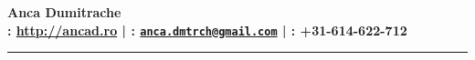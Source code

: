\documentclass[10pt]{article}
\renewcommand\emph[1]{#1}
\newcommand{\makeheading}[2][]%
        {\hspace*{-\marginparsep minus \marginparwidth}%
         \begin{minipage}[t]{\textwidth+\marginparwidth+\marginparsep}%
             {\large \bfseries #2 \hfill #1}\\[-0.15\baselineskip]%
                 \rule{\columnwidth}{1pt}%
         \end{minipage}}
\renewcommand{\section}[1]{\pagebreak[3]%
    \vspace{1.3\baselineskip}%
    \phantomsection\addcontentsline{toc}{section}{#1}%
    \noindent\llap{\scshape\smash{\parbox[t]{\marginparwidth}{\hyphenpenalty=10000\raggedright #1}}}%
    \vspace{-\baselineskip}\par}
\providecommand*\emaillink[1]{\nolinkurl{#1}}
\providecommand*\email[1]{\href{mailto:#1}{\emaillink{#1}}}
\begin{document}
\makeheading{Anca Dumitrache \\ %
\textmd{\normalsize{\Info: \url{http://ancad.ro} | \Letter: \email{anca.dmtrch@gmail.com} | \phone: +31-614-622-712}}}


%
%
\newlength{\rcollength}\setlength{\rcollength}{2.5in}%
\newlength{\spacewidth}\setlength{\spacewidth}{12pt}
%


\end{document}

